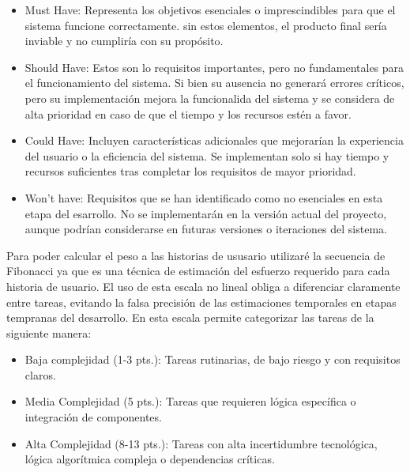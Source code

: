 ﻿\documentclass{iccmemoria}
\begin{document}
\begin{itemize}
    \item Must Have: Representa los objetivos esenciales o imprescindibles para que el sistema funcione correctamente. sin estos elementos, el producto final sería inviable y no cumpliría con su propósito.

    \item Should Have: Estos son lo requisitos importantes, pero no fundamentales para el funcionamiento del sistema. Si bien su ausencia no generará errores críticos, pero su implementación mejora la funcionalida del sistema y se considera de alta prioridad en caso de que el tiempo y los recursos estén a favor.

    \item Could Have:  Incluyen características adicionales que mejorarían la experiencia del usuario o la eficiencia del sistema. Se implementan solo si hay tiempo y recursos suficientes tras completar los requisitos de mayor prioridad.

    \item Won't have: Requisitos que se han identificado como no esenciales en esta etapa del esarrollo. No se implementarán en la versión actual del proyecto, aunque podrían considerarse en futuras versiones o iteraciones del sistema.
\end{itemize}

Para poder calcular el peso a las historias de ususario utilizaré la secuencia de Fibonacci ya que es una técnica de estimación del esfuerzo requerido para cada historia de usuario. El uso de esta escala no lineal obliga a diferenciar claramente entre tareas, evitando la falsa precisión de las estimaciones temporales en etapas tempranas del desarrollo. En esta escala permite categorizar las tareas de la siguiente manera:

\begin{itemize}
    \item Baja complejidad (1-3 pts.): Tareas rutinarias, de bajo riesgo y con requisitos claros.

    \item Media Complejidad (5 pts.): Tareas que requieren lógica específica o integración de componentes.

    \item Alta Complejidad (8-13 pts.): Tareas con alta incertidumbre tecnológica, lógica algorítmica compleja o dependencias críticas.
\end{itemize}
\end{document}
